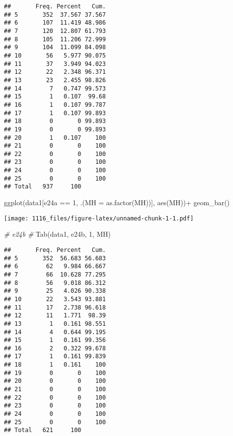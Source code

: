 \documentclass[
]{article}
\newenvironment{Shaded}{\begin{snugshade}}{\end{snugshade}}
\newcommand{\AttributeTok}[1]{\textcolor[rgb]{0.77,0.63,0.00}{#1}}
\newcommand{\CommentTok}[1]{\textcolor[rgb]{0.56,0.35,0.01}{\textit{#1}}}
\newcommand{\DecValTok}[1]{\textcolor[rgb]{0.00,0.00,0.81}{#1}}
\newcommand{\FunctionTok}[1]{\textcolor[rgb]{0.00,0.00,0.00}{#1}}
\newcommand{\NormalTok}[1]{#1}
\newcommand{\SpecialCharTok}[1]{\textcolor[rgb]{0.00,0.00,0.00}{#1}}
\newcommand{\StringTok}[1]{\textcolor[rgb]{0.31,0.60,0.02}{#1}}
\begin{document}
\begin{verbatim}
##       Freq. Percent   Cum.
## 5       352  37.567 37.567
## 6       107  11.419 48.986
## 7       120  12.807 61.793
## 8       105  11.206 72.999
## 9       104  11.099 84.098
## 10       56   5.977 90.075
## 11       37   3.949 94.023
## 12       22   2.348 96.371
## 13       23   2.455 98.826
## 14        7   0.747 99.573
## 15        1   0.107  99.68
## 16        1   0.107 99.787
## 17        1   0.107 99.893
## 18        0       0 99.893
## 19        0       0 99.893
## 20        1   0.107    100
## 21        0       0    100
## 22        0       0    100
## 23        0       0    100
## 24        0       0    100
## 25        0       0    100
## Total   937     100
\end{verbatim}

\begin{Shaded}
\begin{Highlighting}[]
\FunctionTok{ggplot}\NormalTok{(data1[e24a }\SpecialCharTok{==} \DecValTok{1}\NormalTok{, .(}\AttributeTok{MH =} \FunctionTok{as.factor}\NormalTok{(MH))], }\FunctionTok{aes}\NormalTok{(MH))}\SpecialCharTok{+}
    \FunctionTok{geom\_bar}\NormalTok{()}
\end{Highlighting}
\end{Shaded}

\texttt{[image: 1116\_files/figure-latex/unnamed-chunk-1-1.pdf]}

\begin{Shaded}
\begin{Highlighting}[]
\CommentTok{\# e24b \#}
\FunctionTok{Tab}\NormalTok{(data1, }\StringTok{\textquotesingle{}e24b\textquotesingle{}}\NormalTok{, }\DecValTok{1}\NormalTok{, }\StringTok{\textquotesingle{}MH\textquotesingle{}}\NormalTok{)}
\end{Highlighting}
\end{Shaded}

\begin{verbatim}
##       Freq. Percent   Cum.
## 5       352  56.683 56.683
## 6        62   9.984 66.667
## 7        66  10.628 77.295
## 8        56   9.018 86.312
## 9        25   4.026 90.338
## 10       22   3.543 93.881
## 11       17   2.738 96.618
## 12       11   1.771  98.39
## 13        1   0.161 98.551
## 14        4   0.644 99.195
## 15        1   0.161 99.356
## 16        2   0.322 99.678
## 17        1   0.161 99.839
## 18        1   0.161    100
## 19        0       0    100
## 20        0       0    100
## 21        0       0    100
## 22        0       0    100
## 23        0       0    100
## 24        0       0    100
## 25        0       0    100
## Total   621     100
\end{verbatim}
\end{document}
